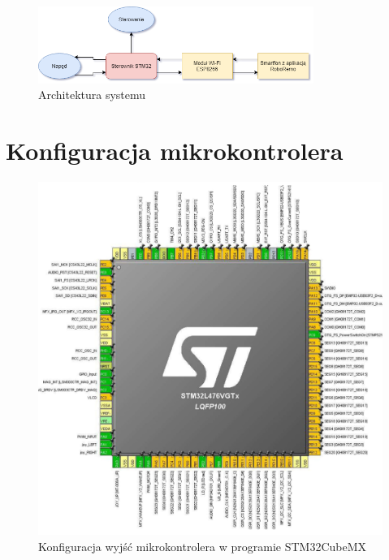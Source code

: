 \documentclass[10pt, a4paper]{article}
\begin{document}
\begin{figure}[H]
	\centering
	\includegraphics[width=0.8\textwidth]{figures/diagram.png}
	\caption{Architektura systemu}
	\label{fig:Architektura}
\end{figure}

\section{Konfiguracja mikrokontrolera}

\begin{figure}[H]
	\centering
	\includegraphics[width=1\textwidth]{figures/schemat-1.jpg}
	\caption{Konfiguracja wyjść mikrokontrolera w programie STM32CubeMX}
	\label{fig:KonfiguracjaMikrokontrolera}
\end{figure}
\end{document}
